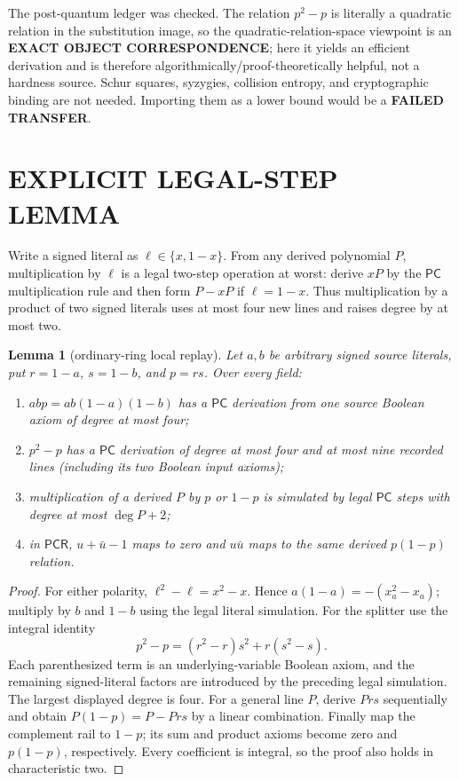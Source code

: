 \documentclass[11pt]{article}
\newtheorem{lemma}[theorem]{Lemma}
\newcommand{\PC}{\ensuremath{\mathsf{PC}}}
\newcommand{\PCR}{\ensuremath{\mathsf{PCR}}}
\begin{document}
The post-quantum ledger was checked.  The relation $p^2-p$ is literally a
quadratic relation in the substitution image, so the quadratic-relation-space
viewpoint is an \textbf{EXACT OBJECT CORRESPONDENCE}; here it yields an
efficient derivation and is therefore algorithmically/proof-theoretically
helpful, not a hardness source.  Schur squares, syzygies, collision entropy,
and cryptographic binding are not needed.  Importing them as a lower bound
would be a \textbf{FAILED TRANSFER}.

\section{EXPLICIT LEGAL-STEP LEMMA}
Write a signed literal as $\ell\in\{x,1-x\}$.  From any derived polynomial
$P$, multiplication by $\ell$ is a legal two-step operation at worst:
derive $xP$ by the \PC{} multiplication rule and then form
$P-xP$ if $\ell=1-x$.  Thus multiplication by a product of two signed
literals uses at most four new lines and raises degree by at most two.

\begin{lemma}[ordinary-ring local replay]
Let $a,b$ be arbitrary signed source literals, put
$r=1-a$, $s=1-b$, and $p=rs$.  Over every field:
\begin{enumerate}
\item $abp=ab(1-a)(1-b)$ has a \PC{} derivation from one source Boolean
axiom of degree at most four;
\item $p^2-p$ has a \PC{} derivation of degree at most four and at most nine
recorded lines (including its two Boolean input axioms);
\item multiplication of a derived $P$ by $p$ or $1-p$ is simulated by legal
\PC{} steps with degree at most $\deg P+2$;
\item in \PCR{}, $u+\bar u-1$ maps to zero and $u\bar u$ maps to the same
derived $p(1-p)$ relation.
\end{enumerate}
\end{lemma}
\begin{proof}
For either polarity, $\ell^2-\ell=x^2-x$.  Hence
$a(1-a)=-(x_a^2-x_a)$; multiply by $b$ and $1-b$ using the legal literal
simulation.  For the splitter use the integral identity
\[
p^2-p=(r^2-r)s^2+r(s^2-s).
\]
Each parenthesized term is an underlying-variable Boolean axiom, and the
remaining signed-literal factors are introduced by the preceding legal
simulation.  The largest displayed degree is four.  For a general line $P$,
derive $Prs$ sequentially and obtain $P(1-p)=P-Prs$ by a linear combination.
Finally map the complement rail to $1-p$; its sum and product axioms become
zero and $p(1-p)$, respectively.  Every coefficient is integral, so the proof
also holds in characteristic two.
\end{proof}
\end{document}
